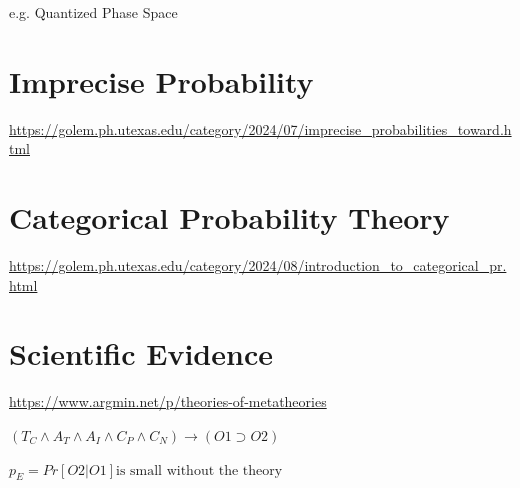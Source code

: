 e.g. Quantized Phase Space



\section{Imprecise Probability}\label{sec:imprecise_probability}

\url{https://golem.ph.utexas.edu/category/2024/07/imprecise_probabilities_toward.html}



\section{Categorical Probability Theory}\label{sec:categorical_probability}

\url{https://golem.ph.utexas.edu/category/2024/08/introduction_to_categorical_pr.html}



\section{Scientific Evidence}\label{sec:scientific_evidence}

\url{https://www.argmin.net/p/theories-of-metatheories}

$(T_C \wedge A_T \wedge A_I \wedge C_P \wedge C_N) \to (O1 \supset O2)$

$p_E = Pr[O2 | O1] \text{is small without the theory}$

